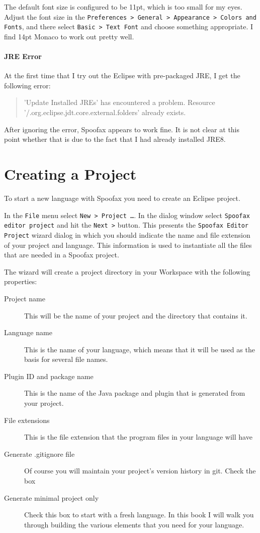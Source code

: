 The default font size is configured to be 11pt, which is too small for my eyes. 
Adjust the font size in the \texttt{Preferences > General > Appearance > Colors
and Fonts}, and there select \texttt{Basic > Text Font} and choose something
appropriate. I find 14pt Monaco to work out pretty well.

\paragraph{JRE Error}

At the first time that I try out the Eclipse with pre-packaged JRE, I get the
following error: 

\begin{quote}
'Update Installed JREs' has encountered a problem.
Resource '/.org.eclipse.jdt.core.external.folders' already exists.
\end{quote} 

\noindent
After ignoring the error, Spoofax appears to work fine. It is not clear at this
point whether that is due to the fact that I had already installed JRE8.

\section{Creating a Project}

To start a new language with Spoofax you need to create an Eclipse project.

In the \texttt{File} menu select \texttt{New > Project \ldots}. In the dialog
window select \texttt{Spoofax editor project} and hit the \texttt{Next >}
button. This presents the \texttt{Spoofax Editor Project} wizard dialog in
which you should indicate the name and file extension of your project
and language. This information is used to instantiate all the files that are
needed in a Spoofax project.

The wizard will create a project directory in your Workspace with the following
properties:

\begin{description}
\item[Project name] This will be the name of your project and the directory that
contains it.
\item[Language name] This is the name of your language, which means that it will
be used as the basis for several file names.
\item[Plugin ID and package name] This is the name of the Java
package and plugin that is generated from your project.
\item[File extensions] This is the file extension that the program files in
your language will have 
\item[Generate .gitignore file] Of course you will maintain your project's
version history in git. Check the box
\item[Generate minimal project only] Check this box to start with a fresh
language. In this book I will walk you through building the various elements
that you need for your language.
\end{description}

